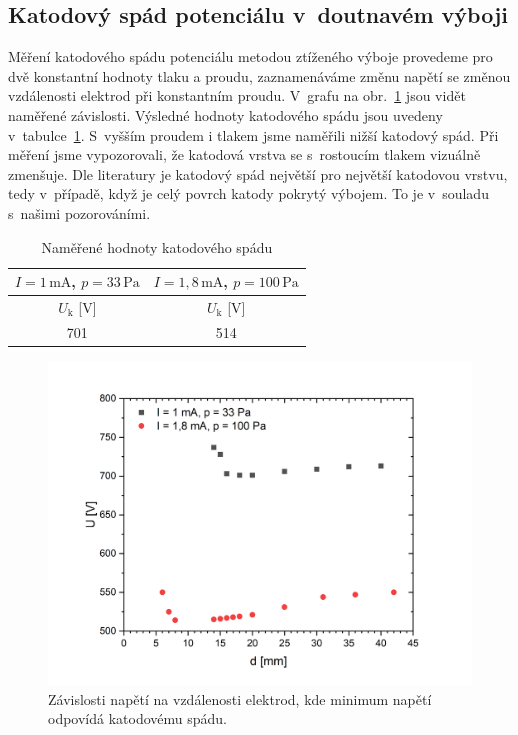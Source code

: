 \documentclass[a4paper,12pt]{article}
\begin{document}
\subsection{Katodový spád potenciálu v~doutnavém výboji}
Měření katodového spádu potenciálu metodou ztíženého výboje provedeme pro dvě konstantní hodnoty tlaku a proudu, 
zaznamenáváme změnu napětí se změnou vzdálenosti elektrod při konstantním 
proudu. V~grafu na 
obr.~\ref{KatodovySpad} jsou vidět naměřené závislosti. Výsledné hodnoty 
katodového spádu jsou uvedeny v~tabulce~\ref{tab2}. S~vyšším proudem i tlakem
jsme naměřili nižší katodový spád. Při měření jsme vypozorovali, 
že katodová vrstva se s~rostoucím tlakem vizuálně zmenšuje. Dle literatury je katodový spád největší pro největší katodovou vrstvu, tedy v~případě, když je celý povrch katody pokrytý výbojem. To je v~souladu s~našimi pozorováními.

	  


\begin{center}
	\begin{table}[h!]
		\centering
		\caption{Naměřené hodnoty katodového spádu}
		\label{tab2}
		\begin{tabular}{|c|c|} \hline
			$I = 1\,\si{\milli\ampere}$, $p = 33\,\si{\pascal}$ 
			& $I = 1,8\,\si{\milli\ampere}$, $p = 100\,\si{\pascal}$\\ \hline
			$U_\text{k}$ [V] & $U_\text{k}$ [V]\\ \hline
			701 & 514 \\ \hline
			
		\end{tabular}
	\end{table}
\end{center}

\begin{figure}[h!]
	\centering
	\includegraphics[width=145mm]{KatodovySpad.png}
	\caption{Závislosti napětí na vzdálenosti elektrod, kde minimum napětí odpovídá katodovému spádu.}
	\label{KatodovySpad}
\end{figure}
\end{document}
